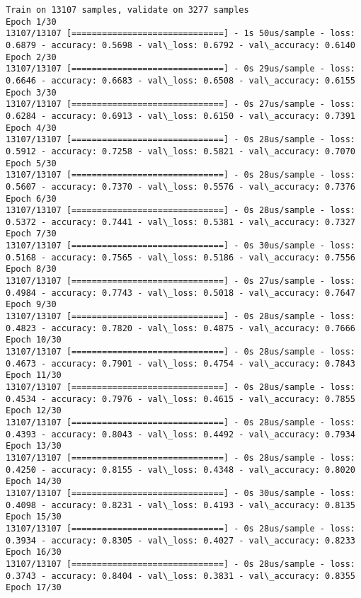 \documentclass[11pt]{article}
\begin{document}
    \begin{Verbatim}[commandchars=\\\{\}]
Train on 13107 samples, validate on 3277 samples
Epoch 1/30
13107/13107 [==============================] - 1s 50us/sample - loss: 0.6879 - accuracy: 0.5698 - val\_loss: 0.6792 - val\_accuracy: 0.6140
Epoch 2/30
13107/13107 [==============================] - 0s 29us/sample - loss: 0.6646 - accuracy: 0.6683 - val\_loss: 0.6508 - val\_accuracy: 0.6155
Epoch 3/30
13107/13107 [==============================] - 0s 27us/sample - loss: 0.6284 - accuracy: 0.6913 - val\_loss: 0.6150 - val\_accuracy: 0.7391
Epoch 4/30
13107/13107 [==============================] - 0s 28us/sample - loss: 0.5912 - accuracy: 0.7258 - val\_loss: 0.5821 - val\_accuracy: 0.7070
Epoch 5/30
13107/13107 [==============================] - 0s 28us/sample - loss: 0.5607 - accuracy: 0.7370 - val\_loss: 0.5576 - val\_accuracy: 0.7376
Epoch 6/30
13107/13107 [==============================] - 0s 28us/sample - loss: 0.5372 - accuracy: 0.7441 - val\_loss: 0.5381 - val\_accuracy: 0.7327
Epoch 7/30
13107/13107 [==============================] - 0s 30us/sample - loss: 0.5168 - accuracy: 0.7565 - val\_loss: 0.5186 - val\_accuracy: 0.7556
Epoch 8/30
13107/13107 [==============================] - 0s 27us/sample - loss: 0.4984 - accuracy: 0.7743 - val\_loss: 0.5018 - val\_accuracy: 0.7647
Epoch 9/30
13107/13107 [==============================] - 0s 28us/sample - loss: 0.4823 - accuracy: 0.7820 - val\_loss: 0.4875 - val\_accuracy: 0.7666
Epoch 10/30
13107/13107 [==============================] - 0s 28us/sample - loss: 0.4673 - accuracy: 0.7901 - val\_loss: 0.4754 - val\_accuracy: 0.7843
Epoch 11/30
13107/13107 [==============================] - 0s 28us/sample - loss: 0.4534 - accuracy: 0.7976 - val\_loss: 0.4615 - val\_accuracy: 0.7855
Epoch 12/30
13107/13107 [==============================] - 0s 28us/sample - loss: 0.4393 - accuracy: 0.8043 - val\_loss: 0.4492 - val\_accuracy: 0.7934
Epoch 13/30
13107/13107 [==============================] - 0s 28us/sample - loss: 0.4250 - accuracy: 0.8155 - val\_loss: 0.4348 - val\_accuracy: 0.8020
Epoch 14/30
13107/13107 [==============================] - 0s 30us/sample - loss: 0.4098 - accuracy: 0.8231 - val\_loss: 0.4193 - val\_accuracy: 0.8135
Epoch 15/30
13107/13107 [==============================] - 0s 28us/sample - loss: 0.3934 - accuracy: 0.8305 - val\_loss: 0.4027 - val\_accuracy: 0.8233
Epoch 16/30
13107/13107 [==============================] - 0s 28us/sample - loss: 0.3743 - accuracy: 0.8404 - val\_loss: 0.3831 - val\_accuracy: 0.8355
Epoch 17/30

\end{Verbatim}
\end{document}
